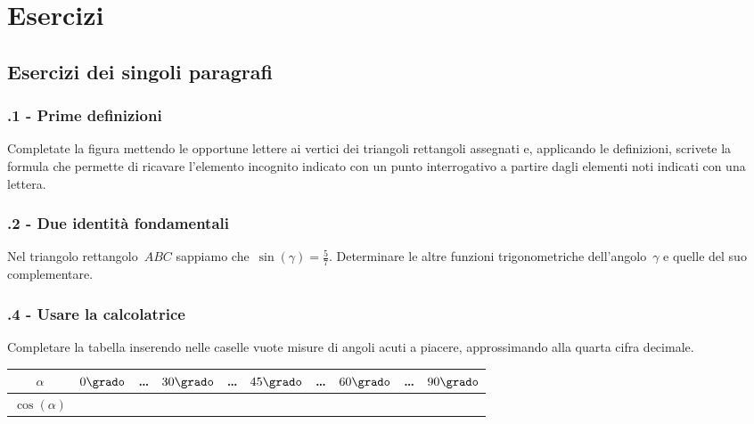 
\section{Esercizi}
\subsection{Esercizi dei singoli paragrafi}
\subsubsection*{\thechapter.1 - Prime definizioni}

\begin{esercizio}
\label{ese:G.1}
Completate la figura mettendo le opportune lettere ai vertici dei triangoli rettangoli assegnati e, applicando le definizioni, scrivete la formula
che permette di ricavare l'elemento incognito indicato con un punto interrogativo a partire dagli elementi noti indicati con una lettera.
\begin{center}
 
\end{center}

\end{esercizio}

\subsubsection*{\thechapter.2 - Due identità fondamentali}

\begin{esercizio}
\label{ese:G.2}
Nel triangolo rettangolo~$ABC$ sappiamo che~$\sin(\gamma )=\frac{5}{7}$.
Determinare le altre funzioni trigonometriche dell'angolo~$\gamma$ e quelle del suo complementare.
\end{esercizio}

\subsubsection*{\thechapter.4 - Usare la calcolatrice}

\begin{esercizio}
\label{ese:G.3}
Completare la tabella inserendo nelle caselle vuote misure di angoli acuti a piacere, approssimando alla quarta cifra decimale.
\begin{center}
\begin{tabular}{cccccccccc}
\toprule
$\alpha$ & $0\grado$ & \ldots & $30\grado$ & \ldots & $45\grado$ & \ldots & $60\grado$ & \ldots & $90\grado$\\
\midrule
$\cos(\alpha)$ & & & & & & & & & \\
\bottomrule
\end{tabular}
\end{center}
\end{esercizio}

